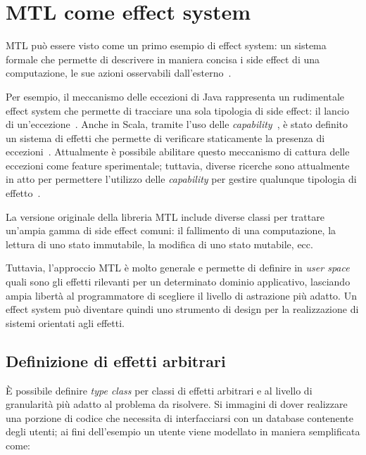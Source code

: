 \section{MTL come effect system}

MTL può essere visto come un primo esempio di effect system: un sistema formale che permette di descrivere in maniera concisa i side effect di una computazione, le sue azioni osservabili dall'esterno~\cite[p.~943]{cit:design-concepts-in-programming-languages}.

Per esempio, il meccanismo delle eccezioni di Java rappresenta un rudimentale effect system che permette di tracciare una sola tipologia di side effect: il lancio di un'eccezione~\cite[p.~985]{cit:design-concepts-in-programming-languages}.
Anche in Scala, tramite l'uso delle \emph{capability}~\cite{cit:scala-3-reference-canthrow}, è stato definito un sistema di effetti che permette di verificare staticamente la presenza di eccezioni~\cite{cit:safer-exceptions-for-scala}. Attualmente è possibile abilitare questo meccanismo di cattura delle eccezioni come feature sperimentale; tuttavia, diverse ricerche sono attualmente in atto per permettere l'utilizzo delle \emph{capability} per gestire qualunque tipologia di effetto~\cite{cit:effects-capabilities-and-boxes-from-scope-based-reasoning-to-type-based-reasoning-and-back,cit:caprese}.

La versione originale della libreria MTL include diverse classi per trattare un'ampia gamma di side effect comuni: il fallimento di una computazione, la lettura di uno stato immutabile, la modifica di uno stato mutabile, ecc.

Tuttavia, l'approccio MTL è molto generale e permette di definire in \emph{user space} quali sono gli effetti rilevanti per un determinato dominio applicativo, lasciando ampia libertà al programmatore di scegliere il livello di astrazione più adatto.
Un effect system può diventare quindi uno strumento di design per la realizzazione di sistemi orientati agli effetti.

\subsection{Definizione di effetti arbitrari}
\label{sec:mtl-effetti-arbitrari}
È possibile definire \emph{type class} per classi di effetti arbitrari e al livello di granularità più adatto al problema da risolvere. Si immagini di dover realizzare una porzione di codice che necessita di interfacciarsi con un database contenente degli utenti; ai fini dell'esempio un utente viene modellato in maniera semplificata come:


